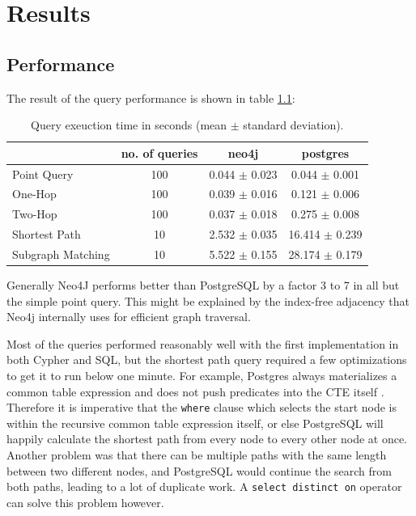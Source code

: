 \documentclass[11pt, a4paper,oneside,chapterprefix=false]{scrbook}
\begin{document}
\chapter{Results} \label{chp:results}



\section{Performance} \label{sec:performance}

The result of the query performance is shown in table \ref{table:performance}:

\begin{table}[H]
	\begin{center}
		\begin{tabular}{ |l|c|c|c| }
			\hline
			& no. of queries & neo4j & postgres \\
			\hline
			Point Query & 100 & 0.044 $\pm$ 0.023 & 0.044 $\pm$ 0.001 \\
			One-Hop & 100 & 0.039 $\pm$ 0.016 & 0.121 $\pm$ 0.006 \\
			Two-Hop & 100 & 0.037 $\pm$ 0.018 & 0.275 $\pm$ 0.008 \\
			Shortest Path & 10 & 2.532 $\pm$ 0.035 & 16.414 $\pm$ 0.239 \\
			Subgraph Matching & 10 & 5.522 $\pm$ 0.155 & 28.174 $\pm$ 0.179 \\
			\hline
		\end{tabular}
		\caption{\label{table:performance} Query exeuction time in seconds (mean $\pm$ standard deviation).}
	\end{center}
\end{table}

Generally Neo4J performs better than PostgreSQL by a factor 3 to 7 in all but the simple point query.
This might be explained by the index-free adjacency that Neo4j internally uses for efficient graph traversal.

Most of the queries performed reasonably well with the first implementation in both Cypher and SQL, but the shortest path query required a few optimizations to get it to run below one minute. For example, Postgres always materializes a common table expression and does not push predicates into the CTE itself \cite{postgresMaterialize}.
Therefore it is imperative that the \lstinline{where} clause which selects the start node is within the recursive common table expression itself, or else PostgreSQL will happily calculate the shortest path from every node to every other node at once.
Another problem was that there can be multiple paths with the same length between two different nodes, and PostgreSQL would continue the search from both paths, leading to a lot of duplicate work. A \lstinline{select distinct on} operator can solve this problem however.
\end{document}
